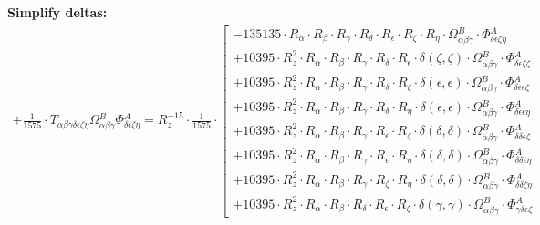\documentclass{article}
\begin{document}
\textbf{Simplify deltas:}
\begin{subequations}\begin{gather}
+ \frac{1}{1575} \cdot T_{\alpha{}\beta{}\gamma{}\delta{}\epsilon{}\zeta{}\eta{}} \Omega{}^{B}_{\alpha{}\beta{}\gamma{}} \Phi{}^{A}_{\delta{}\epsilon{}\zeta{}\eta{}} = R_{z}^{-15} \cdot \frac{1}{1575} \cdot  \left[ \begin{array}{c} 
 		- 135135 \cdot R_{\alpha{}} \cdot R_{\beta{}} \cdot R_{\gamma{}} \cdot R_{\delta{}} \cdot R_{\epsilon{}} \cdot R_{\zeta{}} \cdot R_{\eta{}} \cdot \Omega{}^{B}_{\alpha{}\beta{}\gamma{}} \cdot \Phi{}^{A}_{\delta{}\epsilon{}\zeta{}\eta{}} 
 \\[0.2em] 		 + 10395 \cdot R_{z}^{2} \cdot R_{\alpha{}} \cdot R_{\beta{}} \cdot R_{\gamma{}} \cdot R_{\delta{}} \cdot R_{\epsilon{}} \cdot \delta{}\left(\zeta{}, \zeta{}\right) \cdot \Omega{}^{B}_{\alpha{}\beta{}\gamma{}} \cdot \Phi{}^{A}_{\delta{}\epsilon{}\zeta{}\zeta{}} 
 \\[0.2em] 		 + 10395 \cdot R_{z}^{2} \cdot R_{\alpha{}} \cdot R_{\beta{}} \cdot R_{\gamma{}} \cdot R_{\delta{}} \cdot R_{\zeta{}} \cdot \delta{}\left(\epsilon{}, \epsilon{}\right) \cdot \Omega{}^{B}_{\alpha{}\beta{}\gamma{}} \cdot \Phi{}^{A}_{\delta{}\epsilon{}\epsilon{}\zeta{}} 
 \\[0.2em] 		 + 10395 \cdot R_{z}^{2} \cdot R_{\alpha{}} \cdot R_{\beta{}} \cdot R_{\gamma{}} \cdot R_{\delta{}} \cdot R_{\eta{}} \cdot \delta{}\left(\epsilon{}, \epsilon{}\right) \cdot \Omega{}^{B}_{\alpha{}\beta{}\gamma{}} \cdot \Phi{}^{A}_{\delta{}\epsilon{}\epsilon{}\eta{}} 
 \\[0.2em] 		 + 10395 \cdot R_{z}^{2} \cdot R_{\alpha{}} \cdot R_{\beta{}} \cdot R_{\gamma{}} \cdot R_{\epsilon{}} \cdot R_{\zeta{}} \cdot \delta{}\left(\delta{}, \delta{}\right) \cdot \Omega{}^{B}_{\alpha{}\beta{}\gamma{}} \cdot \Phi{}^{A}_{\delta{}\delta{}\epsilon{}\zeta{}} 
 \\[0.2em] 		 + 10395 \cdot R_{z}^{2} \cdot R_{\alpha{}} \cdot R_{\beta{}} \cdot R_{\gamma{}} \cdot R_{\epsilon{}} \cdot R_{\eta{}} \cdot \delta{}\left(\delta{}, \delta{}\right) \cdot \Omega{}^{B}_{\alpha{}\beta{}\gamma{}} \cdot \Phi{}^{A}_{\delta{}\delta{}\epsilon{}\eta{}} 
 \\[0.2em] 		 + 10395 \cdot R_{z}^{2} \cdot R_{\alpha{}} \cdot R_{\beta{}} \cdot R_{\gamma{}} \cdot R_{\zeta{}} \cdot R_{\eta{}} \cdot \delta{}\left(\delta{}, \delta{}\right) \cdot \Omega{}^{B}_{\alpha{}\beta{}\gamma{}} \cdot \Phi{}^{A}_{\delta{}\delta{}\zeta{}\eta{}} 
 \\[0.2em] 		 + 10395 \cdot R_{z}^{2} \cdot R_{\alpha{}} \cdot R_{\beta{}} \cdot R_{\delta{}} \cdot R_{\epsilon{}} \cdot R_{\zeta{}} \cdot \delta{}\left(\gamma{}, \gamma{}\right) \cdot \Omega{}^{B}_{\alpha{}\beta{}\gamma{}} \cdot \Phi{}^{A}_{\gamma{}\delta{}\epsilon{}\zeta{}} 

\end{array}
\end{gather}
\end{subequations}
\end{document}
